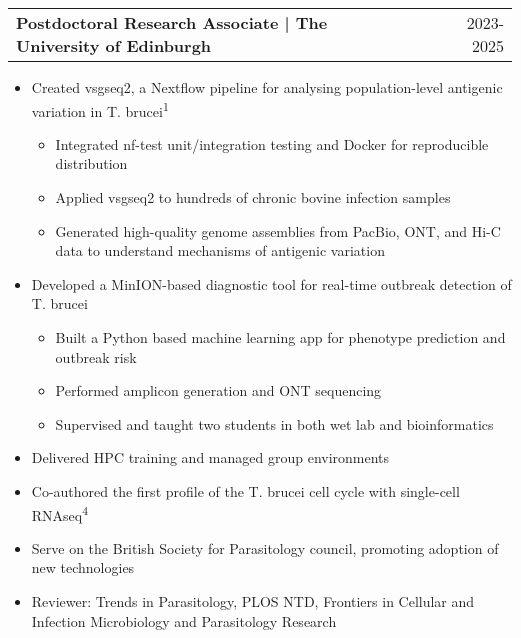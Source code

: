\documentclass[a4paper,11pt]{article}
\makeatletter
\newenvironment{joblong}[2]{
  \begin{tabularx}{\linewidth}{@{}l X r@{}}
  \textbf{#1} & & #2 \\[2pt]
  \end{tabularx}
  \begin{itemize}[leftmargin=1.2em, itemsep=3pt, label=-]
}{
  \end{itemize}
}
\makeatother
\begin{document}
\begin{joblong}{Postdoctoral Research Associate | The University of Edinburgh}{2023-2025}
\item Created vsgseq2, a Nextflow pipeline for analysing population-level antigenic variation in T. brucei\textsuperscript{1}
    \begin{itemize}[leftmargin=2em, itemsep=2pt, label=$\circ$]
        \item Integrated nf-test unit/integration testing and Docker for reproducible distribution
        \item Applied vsgseq2 to hundreds of chronic bovine infection samples
        \item Generated high-quality genome assemblies from PacBio, ONT, and Hi-C data to understand mechanisms of antigenic variation
    \end{itemize}
\item Developed a MinION-based diagnostic tool for real-time outbreak detection of T. brucei
    \begin{itemize}[leftmargin=2em, itemsep=2pt, label=$\circ$]
        \item Built a Python based machine learning app for phenotype prediction and outbreak risk
        \item Performed amplicon generation and ONT sequencing
        \item Supervised and taught two students in both wet lab and bioinformatics
    \end{itemize}
\item Delivered HPC training and managed group environments
\item Co-authored the first profile of the T. brucei cell cycle with single-cell RNAseq\textsuperscript{4}
\item Serve on the British Society for Parasitology council, promoting adoption of new technologies
\item Reviewer: Trends in Parasitology, PLOS NTD, Frontiers in Cellular and Infection Microbiology and Parasitology Research
\end{joblong}
\end{document}
